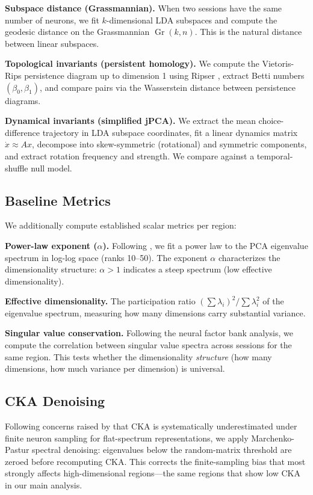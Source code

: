 \documentclass{article}
\begin{document}
\textbf{Subspace distance (Grassmannian).} When two sessions have the same number of neurons, we fit $k$-dimensional LDA subspaces and compute the geodesic distance on the Grassmannian $\operatorname{Gr}(k, n)$. This is the natural distance between linear subspaces.

\textbf{Topological invariants (persistent homology).} We compute the Vietoris-Rips persistence diagram up to dimension 1 using Ripser \citep{bauer2021ripser}, extract Betti numbers $(\beta_0, \beta_1)$, and compare pairs via the Wasserstein distance between persistence diagrams.

\textbf{Dynamical invariants (simplified jPCA).} We extract the mean choice-difference trajectory in LDA subspace coordinates, fit a linear dynamics matrix $\dot{x} \approx Ax$, decompose into skew-symmetric (rotational) and symmetric components, and extract rotation frequency and strength. We compare against a temporal-shuffle null model.

\subsection{Baseline Metrics}

We additionally compute established scalar metrics per region:

\textbf{Power-law exponent ($\alpha$).} Following \citet{stringer2019high}, we fit a power law to the PCA eigenvalue spectrum in log-log space (ranks 10--50). The exponent $\alpha$ characterizes the dimensionality structure: $\alpha > 1$ indicates a steep spectrum (low effective dimensionality).

\textbf{Effective dimensionality.} The participation ratio $(\sum \lambda_i)^2 / \sum \lambda_i^2$ of the eigenvalue spectrum, measuring how many dimensions carry substantial variance.

\textbf{Singular value conservation.} Following the neural factor bank analysis, we compute the correlation between singular value spectra across sessions for the same region. This tests whether the dimensionality \emph{structure} (how many dimensions, how much variance per dimension) is universal.

\subsection{CKA Denoising}

Following concerns raised by \citet{spectral2025neurips} that CKA is systematically underestimated under finite neuron sampling for flat-spectrum representations, we apply Marchenko-Pastur spectral denoising: eigenvalues below the random-matrix threshold are zeroed before recomputing CKA. This corrects the finite-sampling bias that most strongly affects high-dimensional regions---the same regions that show low CKA in our main analysis.
\end{document}
